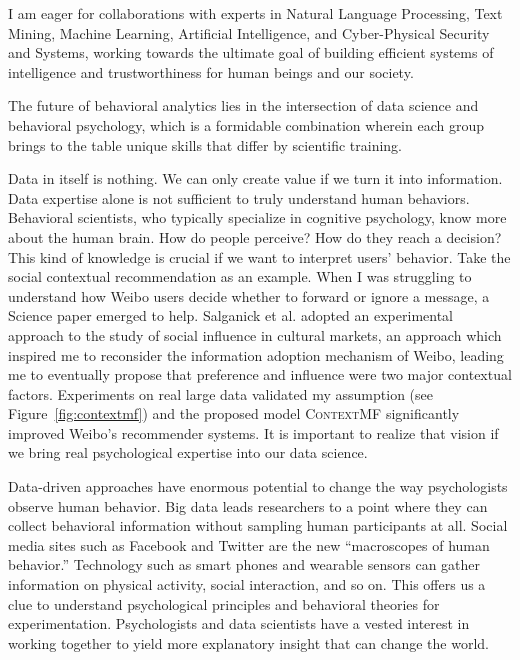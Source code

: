 \documentclass[10.5pt]{article}
\begin{document}
\vskip 0.02in
 I am eager for collaborations with experts in Natural Language Processing, Text Mining, Machine Learning, Artificial Intelligence, and Cyber-Physical Security and Systems, working towards the ultimate goal of building efficient systems of intelligence and trustworthiness for human beings and our society.

\vskip 0.03in
\vskip 0.01in

The future of behavioral analytics lies in the intersection of data science and behavioral psychology, which is a formidable combination wherein each group brings to the table unique skills that differ by scientific training.

Data in itself is nothing. We can only create value if we turn it into information. Data expertise alone is not sufficient to truly understand human behaviors. Behavioral scientists, who typically specialize in cognitive psychology, know more about the human brain. How do people perceive? How do they reach a decision? This kind of knowledge is crucial if we want to interpret users' behavior. Take the social contextual recommendation as an example. When I was struggling to understand how Weibo users decide whether to forward or ignore a message, a Science paper \cite{salganik2006experimental} emerged to help. Salganick et al. adopted an experimental approach to the study of social influence in cultural markets, an approach which inspired me to reconsider the information adoption mechanism of Weibo, leading me to eventually propose that preference and influence were two major contextual factors. Experiments on real large data validated my assumption (see Figure~\ref{fig:contextmf}) and the proposed model \textsc{ContextMF} significantly improved Weibo's recommender systems. It is important to realize that vision if we bring real psychological expertise into our data science.

Data-driven approaches have enormous potential to change the way psychologists observe human behavior. Big data leads researchers to a point where they can collect behavioral information without sampling human participants at all. Social media sites such as Facebook and Twitter are the new ``macroscopes of human behavior.'' Technology such as smart phones and wearable sensors can gather information on physical activity, social interaction, and so on. This offers us a clue to understand psychological principles and behavioral theories for experimentation. Psychologists and data scientists have a vested interest in working together to yield more explanatory insight that can change the world.
\end{document}
